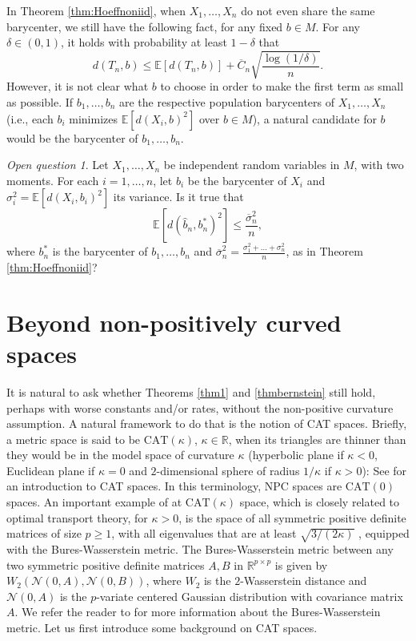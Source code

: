 \documentclass[10pt,a4paper]{article}
\theoremstyle{plain}
\theoremstyle{definition}
\theoremstyle{remark}
\newtheorem*{openquestion}{Open question}
\newcommand{\R}{\mathbb{R}}
\newcommand{\E}{\mathbb{E}}
\newcommand{\CAT}{\textrm{CAT}}
\begin{document}
In Theorem \ref{thm:Hoeffnoniid}, when $X_1,\ldots,X_n$ do not even share the same barycenter, we still have the following fact, for any fixed $b\in M$. For any $\delta\in (0,1)$, it holds with probability at least $1-\delta$ that
$$d(T_n,b)\leq \E[d(T_n,b)]+\overline C_n\sqrt{\frac{\log(1/\delta)}{n}}.$$
However, it is not clear what $b$ to choose in order to make the first term as small as possible. If $b_1,\ldots,b_n$ are the respective population barycenters of $X_1,\ldots,X_n$ (i.e., each $b_i$ minimizes $\E[d(X_i,b)^2]$ over $b\in M$), a natural candidate for $b$ would be the barycenter of $b_1,\ldots,b_n$. 

\begin{openquestion}
Let $X_1,\ldots,X_n$ be independent random variables in $M$, with two moments. For each $i=1,\ldots,n$, let $b_i$ be the barycenter of $X_i$ and $\sigma_i^2=\E[d(X_i,b_i)^2]$ its variance. Is it true that 
$$\E[d(\hat b_n,b_n^*)^2]\leq\frac{\overline\sigma_n^2}{n},$$
where $b_n^*$ is the barycenter of $b_1,\ldots,b_n$ and $\overline\sigma_n^2=\frac{\sigma_1^2+\ldots+\sigma_n^2}{n}$, as in Theorem \ref{thm:Hoeffnoniid}?
\end{openquestion}



\section{Beyond non-positively curved spaces}\label{sec:cat1}

It is natural to ask whether Theorems \ref{thm1} and \ref{thmbernstein} still hold, perhaps with worse constants and/or rates, without the non-positive curvature assumption. A natural framework to do that is the notion of CAT spaces. Briefly, a metric space is said to be $\CAT(\kappa)$, $\kappa\in\R$, when its triangles are thinner than they would be in the model space of curvature $\kappa$ (hyperbolic plane if $\kappa<0$, Euclidean plane if $\kappa=0$ and $2$-dimensional sphere of radius $1/\kappa$ if $\kappa>0$): See \cite{bridson2013metric,burago2022course} for an introduction to CAT spaces. In this terminology, NPC spaces are $\CAT(0)$ spaces. An important example of at $\CAT(\kappa)$ space, which is closely related to optimal transport theory, for $\kappa>0$, is the space of all symmetric positive definite matrices of size $p\geq 1$, with all eigenvalues that are at least $\sqrt{3/(2\kappa)}$ \cite[Proposition 2]{massart2019curvature}, equipped with the Bures-Wasserstein metric. The Bures-Wasserstein metric between any two symmetric positive definite matrices $A,B$ in $\R^{p\times p}$ is given by $W_2(\mathcal N(0,A),\mathcal N(0,B))$, where $W_2$ is the $2$-Wasserstein distance and $\mathcal N(0,A)$ is the $p$-variate centered Gaussian distribution with covariance matrix $A$. We refer the reader to \cite{bhatia2019bures} for more information about the Bures-Wasserstein metric. 
Let us first introduce some background on CAT spaces. 
\end{document}
